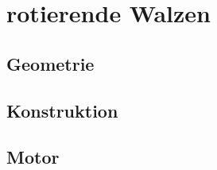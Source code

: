 \chapter{rotierende Walzen}\label{s:rotierendeWalzen}

\section{Geometrie}

\section{Konstruktion}

\section{Motor}

